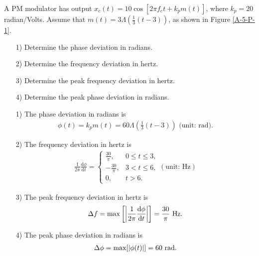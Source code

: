 \documentclass{assignment}
\begin{document}
\begin{prob}
    A PM modulator has output $x_c(t)=10\cos[2\pi f_ct+k_pm(t)]$, where $k_p=20$ radian/Volts. Assume that $m(t)=3\Lambda\left(\frac{1}{3}(t-3)\right)$, as shown in Figure \ref{A-5-P-1}.
    \begin{itemize}
        \item[1)] Determine the phase deviation in radians.
        \item[2)] Determine the frequency deviation in hertz.
        \item[3)] Determine the peak frequency deviation in hertz.
        \item[4)] Determine the peak phase deviation in radians.
    \end{itemize}
\end{prob}
\begin{sol}
    \begin{itemize}
        \item[1)] The phase deviation in radians is
        \begin{align}
            \phi(t)=k_pm(t)=60\Lambda\left(\frac{1}{3}(t-3)\right)\text{ (unit: rad)}.
        \end{align}
        \item[2)] The frequency deviation in hertz is
        \begin{align}
            \frac{1}{2\pi}\frac{\mathrm{d}\phi}{\mathrm{d}t}=\left\{\begin{array}{ll}
                \frac{30}{\pi},&0\leq t\leq 3,\\
                -\frac{30}{\pi},&3< t\leq 6,\\
                0,&t>6.
            \end{array}\right.(\text{unit: Hz})
        \end{align}
        \item[3)] The peak frequency deviation in hertz is
        \begin{align}
            \Delta f=\max\left[\left\lvert\frac{1}{2\pi}\frac{\mathrm{d}\phi}{\mathrm{d}t}\right\rvert\right]=\frac{30}{\pi}\text{ Hz}.
        \end{align}
        \item[4)] The peak phase deviation in radians is
        \begin{align}
            \Delta\phi=\max[\left\lvert\phi(t)\right\rvert]=60\text{ rad}.
        \end{align}
    \end{itemize}
\end{sol}
\end{document}
